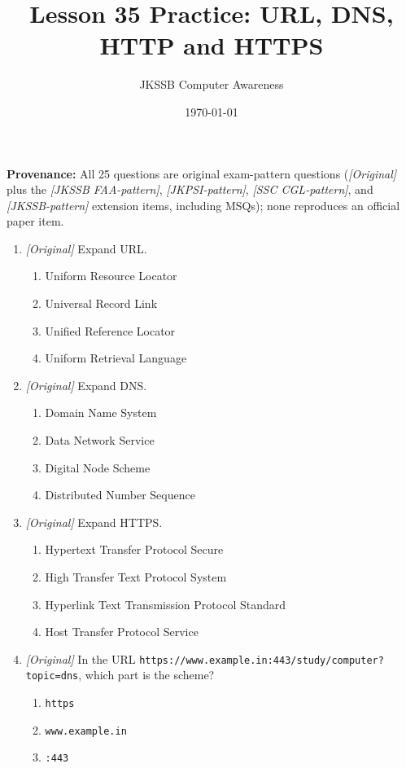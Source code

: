 \documentclass[11pt]{article}
\title{Lesson 35 Practice: URL, DNS, HTTP and HTTPS}
\author{JKSSB Computer Awareness}
\date{\today}
\begin{document}
\maketitle
\noindent\textbf{Provenance:} All 25 questions are original exam-pattern questions (\textit{[Original]} plus the \textit{[JKSSB FAA-pattern]}, \textit{[JKPSI-pattern]}, \textit{[SSC CGL-pattern]}, and \textit{[JKSSB-pattern]} extension items, including MSQs); none reproduces an official paper item.

\begin{enumerate}[label=\textbf{Q\arabic*.}, leftmargin=*]
\item \textit{[Original]} Expand URL.
  \begin{enumerate}[label=\Alph*.]
    \item Uniform Resource Locator
    \item Universal Record Link
    \item Unified Reference Locator
    \item Uniform Retrieval Language
  \end{enumerate}
\item \textit{[Original]} Expand DNS.
  \begin{enumerate}[label=\Alph*.]
    \item Domain Name System
    \item Data Network Service
    \item Digital Node Scheme
    \item Distributed Number Sequence
  \end{enumerate}
\item \textit{[Original]} Expand HTTPS.
  \begin{enumerate}[label=\Alph*.]
    \item Hypertext Transfer Protocol Secure
    \item High Transfer Text Protocol System
    \item Hyperlink Text Transmission Protocol Standard
    \item Host Transfer Protocol Service
  \end{enumerate}
\item \textit{[Original]} In the URL
  \texttt{https://www.example.in:443/study/computer?topic=dns}, which part
  is the scheme?
  \begin{enumerate}[label=\Alph*.]
    \item \texttt{https}
    \item \texttt{www.example.in}
    \item \texttt{:443}

\end{enumerate}
\end{enumerate}
\end{document}
